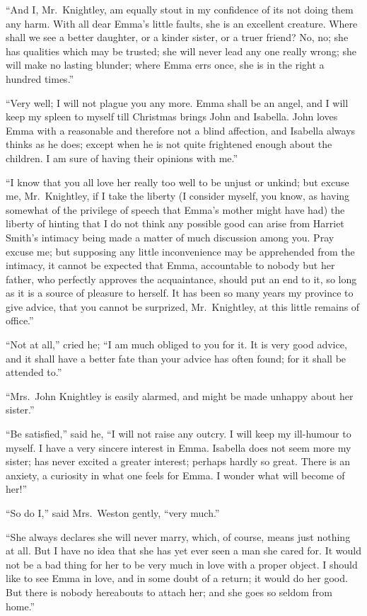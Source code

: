 ``And I, Mr.\ Knightley, am equally stout in my confidence of its
not doing them any harm.  With all dear Emma's little faults,
she is an excellent creature.  Where shall we see a better daughter,
or a kinder sister, or a truer friend? No, no; she has qualities
which may be trusted; she will never lead any one really wrong;
she will make no lasting blunder; where Emma errs once, she is in the
right a hundred times.''

``Very well; I will not plague you any more.  Emma shall be an angel,
and I will keep my spleen to myself till Christmas brings John
and Isabella.  John loves Emma with a reasonable and therefore
not a blind affection, and Isabella always thinks as he does;
except when he is not quite frightened enough about the children.
I am sure of having their opinions with me.''

``I know that you all love her really too well to be unjust or unkind;
but excuse me, Mr.\ Knightley, if I take the liberty (I consider myself,
you know, as having somewhat of the privilege of speech that Emma's
mother might have had) the liberty of hinting that I do not think
any possible good can arise from Harriet Smith's intimacy being made
a matter of much discussion among you.  Pray excuse me; but supposing
any little inconvenience may be apprehended from the intimacy,
it cannot be expected that Emma, accountable to nobody but her father,
who perfectly approves the acquaintance, should put an end to it,
so long as it is a source of pleasure to herself.  It has been so
many years my province to give advice, that you cannot be surprized,
Mr.\ Knightley, at this little remains of office.''

``Not at all,'' cried he; ``I am much obliged to you for it.
It is very good advice, and it shall have a better fate than your
advice has often found; for it shall be attended to.''

``Mrs.\ John Knightley is easily alarmed, and might be made unhappy
about her sister.''

``Be satisfied,'' said he, ``I will not raise any outcry.  I will keep
my ill-humour to myself.  I have a very sincere interest in Emma.
Isabella does not seem more my sister; has never excited a
greater interest; perhaps hardly so great.  There is an anxiety,
a curiosity in what one feels for Emma.  I wonder what will become
of her!''

``So do I,'' said Mrs.\ Weston gently, ``very much.''

``She always declares she will never marry, which, of course,
means just nothing at all.  But I have no idea that she has yet
ever seen a man she cared for.  It would not be a bad thing for her
to be very much in love with a proper object.  I should like to see
Emma in love, and in some doubt of a return; it would do her good.
But there is nobody hereabouts to attach her; and she goes so seldom
from home.''

